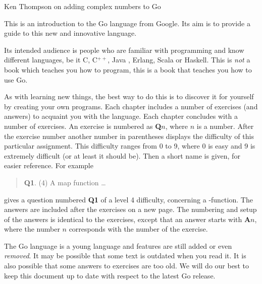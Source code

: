 {Ken Thompson on adding complex numbers to Go}

\noindent{}This is an introduction to the Go language from Google. Its aim
is to provide a guide to this new and innovative language. 

Its intended audience is people who are familiar with programming
and know different languages, be it C\cite{c}, C$^{++}$\cite{c++}, 
Java \cite{java}, Erlang\cite{erlang}, Scala\cite{scala} or
Haskell\cite{haskell}. This is \emph{not} a book which teaches you how to 
program, this is a book that teaches you how to use Go.

As with
learning new things, the best way to do this is to discover it for
yourself by creating your own programs.
Each chapter includes a number of exercises (and answers)
to acquaint you with the language.
Each chapter concludes with a number of exercises. An exercise
is numbered as \textbf{Q$n$}, where $n$ is a number. After the
exercise number another number in parentheses displays the difficulty
of this particular assignment. This difficulty ranges from 0 to 9, where
0 is easy and 9 is extremely difficult (or at least it should be).
Then a short name is given, for easier reference.
For example
\begin{verse}
\textbf{Q1}. (4) A map function \ldots
\end{verse}
    
\noindent gives a question numbered \textbf{Q1} of a level 4 difficulty, concerning a
-function. The answers are included after the exercises on a
new page.
The numbering and setup of the answers is identical to the
exercises, except that an answer starts with \textbf{A$n$}, where the
number $n$ corresponds with the number of the exercise.

\begin{lbar}
\noindent{}The Go language is a young language and
features are still added or even \emph{removed}. It 
may be possible that some text is outdated when you
read it. It is also
possible that some answers to exercises are
too old. We will do our best to keep this document up to 
date with respect to the latest Go release.
\end{lbar}

